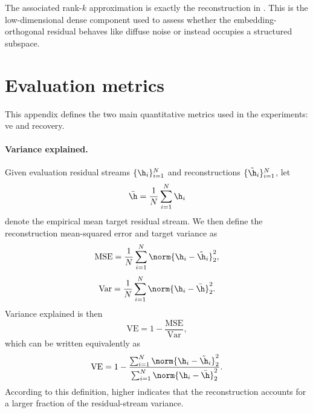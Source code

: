 \documentclass{article}
\begin{document}
The associated rank-$k$ approximation is exactly the reconstruction in . This is the low-dimensional dense component used to assess whether the embedding-orthogonal residual behaves like diffuse noise or instead occupies a structured subspace.

\section{Evaluation metrics} \label{apd:evaluation-metrics}

This appendix defines the two main quantitative metrics used in the experiments: \gls{ve} and  recovery.

\paragraph{Variance explained.}
Given evaluation residual streams $\{\h_i\}_{i=1}^{N}$ and reconstructions $\{\tilde{\h}_i\}_{i=1}^{N}$, let
\begin{equation}
  \label{eq:eval-mean}
  \bar{\h} = \frac{1}{N} \sum_{i=1}^{N} \h_i
\end{equation}
denote the empirical mean target residual stream. We then define the reconstruction mean-squared error and target variance as
\begin{equation}
  \label{eq:eval-mse}
  \mathrm{MSE} = \frac{1}{N} \sum_{i=1}^{N} \norm{\h_i - \tilde{\h}_i}_2^2,
\end{equation}
\begin{equation}
  \label{eq:eval-var}
  \mathrm{Var} = \frac{1}{N} \sum_{i=1}^{N} \norm{\h_i - \bar{\h}}_2^2.
\end{equation}
Variance explained is then
\begin{equation}
  \label{eq:ve-compact}
  \mathrm{VE} = 1 - \frac{\mathrm{MSE}}{\mathrm{Var}},
\end{equation}
which can be written equivalently as
\begin{equation}
  \label{eq:ve}
  \mathrm{VE} = 1 - \frac{\sum_{i=1}^{N} \norm{\h_i - \tilde{\h}_i}_2^2}{\sum_{i=1}^{N} \norm{\h_i - \bar{\h}}_2^2}.
\end{equation}
According to this definition, higher  indicates that the reconstruction accounts for a larger fraction of the residual-stream variance.
\end{document}
